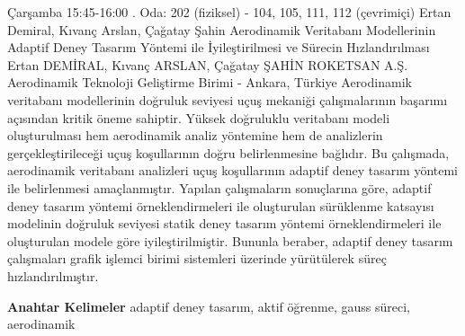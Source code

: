
    \begin{abstract_basarim}
    {Çarşamba 15:45-16:00}
    {.}
    {Oda: 202 (fiziksel) - 104, 105, 111, 112 (çevrimiçi)}
    {Ertan Demiral, Kıvanç Arslan, Çağatay Şahin}
    {Aerodinamik Veritabanı Modellerinin Adaptif Deney Tasarım Yöntemi ile İyileştirilmesi ve Sürecin Hızlandırılması}
    {%
    Ertan DEMİRAL, Kıvanç ARSLAN, Çağatay ŞAHİN}
    {%
    }
    {%
    ROKETSAN A.Ş. Aerodinamik Teknoloji Geliştirme Birimi - Ankara, Türkiye}
    Aerodinamik veritabanı modellerinin doğruluk seviyesi uçuş mekaniği çalışmalarının başarımı açısından kritik öneme sahiptir. Yüksek doğruluklu veritabanı modeli oluşturulması hem aerodinamik analiz yöntemine hem de analizlerin gerçekleştirileceği uçuş koşullarının doğru belirlenmesine bağlıdır. Bu çalışmada, aerodinamik veritabanı analizleri uçuş koşullarının adaptif deney tasarım yöntemi ile belirlenmesi amaçlanmıştır. Yapılan çalışmaların sonuçlarına göre, adaptif deney tasarım yöntemi örneklendirmeleri ile oluşturulan sürüklenme katsayısı modelinin doğruluk seviyesi statik deney tasarım yöntemi örneklendirmeleri ile oluşturulan modele göre iyileştirilmiştir. Bununla beraber, adaptif deney tasarım çalışmaları grafik işlemci birimi sistemleri üzerinde yürütülerek süreç hızlandırılmıştır. 
    
            \textbf{Anahtar Kelimeler} \newline{}adaptif deney tasarım, aktif öğrenme, gauss süreci, aerodinamik
    \end{abstract_basarim}
    